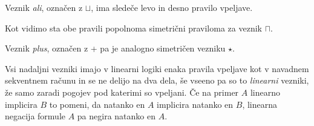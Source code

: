 \begin{definicija} \label{ali}
	Veznik \emph{ali}, označen z $\sqcup$, ima sledeče levo in desno pravilo vpeljave.
	\begin{center}
        \begin{bprooftree}
        \end{bprooftree}
        \begin{bprooftree}
        \end{bprooftree}
        \begin{bprooftree}
        \end{bprooftree}
    \end{center}
    Kot vidimo sta obe pravili popolnoma simetrični praviloma za veznik $\sqcap$.
\end{definicija}

\begin{definicija} \label{plus}
	Veznik \emph{plus}, označen z + pa je analogno simetričen vezniku $\star$.
	\begin{center}
        \begin{bprooftree}
        \end{bprooftree}
        \begin{bprooftree}
        \end{bprooftree}
    \end{center}
\end{definicija}

Vsi nadaljni vezniki imajo v linearni logiki enaka pravila vpeljave kot v navadnem sekventnem računu in se ne delijo na dva dela, še vseeno pa so to \emph{linearni} vezniki, že samo zaradi pogojev pod katerimi so vpeljani. Če na primer $A$ linearno implicira $B$ to pomeni, da natanko en $A$ implicira natanko en $B$, linearna negacija formule $A$ pa negira natanko en $A$.

